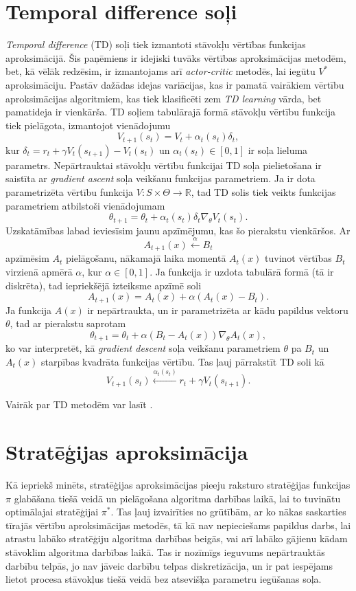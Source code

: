 \documentclass{ludis} %
\begin{document}
\section{Temporal difference soļi} \label{chap:td}
\textit{Temporal difference} (TD) soļi tiek izmantoti stāvokļu vērtības
funkcijas aproksimācijā. Šis paņēmiens ir idejiski tuvāks vērtības
aproksimācijas metodēm, bet, kā vēlāk redzēsim, ir izmantojams arī
\textit{actor-critic} metodēs, lai iegūtu $V^*$ aproksimāciju. Pastāv dažādas
idejas variācijas, kas ir pamatā vairākiem vērtību aproksimācijas algoritmiem,
kas tiek klasificēti zem \textit{TD learning} vārda, bet pamatideja ir
vienkārša. TD soļiem tabulārajā formā stāvokļu vērtību funkcija tiek pielāgota,
izmantojot vienādojumu
\[
	V_{t+1}(s_t) = V_t + \alpha_t(s_t) \delta_t,
\]
kur $\delta_t = r_{t} + \gamma V_t(s_{t + 1}) - V_t(s_t)$ un $\alpha_t(s_t) \in
[0,1]$ ir soļa lieluma parametrs.
Nepārtrauktai stāvokļu vērtību funkcijai TD soļa pielietošana ir saistīta ar
\textit{gradient ascent} soļa veikšanu funkcijas parametriem. Ja ir dota
parametrizēta vērtību funkcija $V:S \times \Theta \rightarrow \mathbb{R}$, tad
TD solis tiek veikts funkcijas parametriem atbilstoši vienādojumam
\[
	\theta_{t+1} = \theta_t + \alpha_t(s_t) \delta_t \nabla_\theta V_t(s_t).
\]
Uzskatāmības labad ieviesīsim jaunu apzīmējumu, kas šo pierakstu vienkāršos.
Ar
\[
	A_{t+1}(x) \xleftarrow{\alpha} B_t
\]
apzīmēsim $A_t$ pielāgošanu, nākamajā laika momentā $A_t(x)$ tuvinot vērtības
$B_t$ virzienā apmērā $\alpha$, kur $\alpha \in [0,1]$. Ja funkcija ir uzdota
tabulārā formā (tā ir diskrēta), tad iepriekšējā izteiksme apzīmē soli
\[
	A_{t+1}(x) = A_t(x) + \alpha(A_t(x) - B_t).
\]
Ja funkcija $A(x)$ ir nepārtraukta, un ir parametrizēta ar kādu papildus vektoru
$\theta$, tad ar pierakstu saprotam
\[
	\theta_{t+1} = \theta_t + \alpha \left(B_t - A_t(x)\right) \nabla_\theta A_t(x),
\]
ko var interpretēt, kā \textit{gradient descent} soļa veikšanu parametriem
$\theta$ pa $B_t$ un $A_t(x)$ starpības kvadrāta funkcijas vērtību. Tas ļauj
pārrakstīt TD soli kā
\[
	V_{t+1}(s_t) \xleftarrow{\alpha_t(s_t)} r_t + \gamma V_t(s_{t + 1}).
\]

Vairāk par TD metodēm var lasīt \autocite{Hasselt2012}.

\section{Stratēģijas aproksimācija}
Kā iepriekš minēts, stratēģijas aproksimācijas pieeju raksturo stratēģijas
funkcijas $\pi$ glabāšana tiešā veidā un pielāgošana algoritma darbības laikā,
lai to tuvinātu optimālajai stratēģijai $\pi^*$. Tas ļauj izvairīties no
grūtībām, ar ko nākas saskarties tīrajās vērtību aproksimācijas metodēs, tā kā
nav nepieciešams papildus darbs, lai atrastu labāko stratēģiju algoritma
darbības beigās, vai arī labāko gājienu kādam stāvoklim algoritma darbības
laikā. Tas ir nozīmīgs ieguvums nepārtrauktās darbību telpās, jo nav jāveic
darbību telpas diskretizācija, un ir pat iespējams lietot procesa stāvokļus
tiešā veidā bez atsevišķa parametru iegūšanas soļa.
\end{document}
